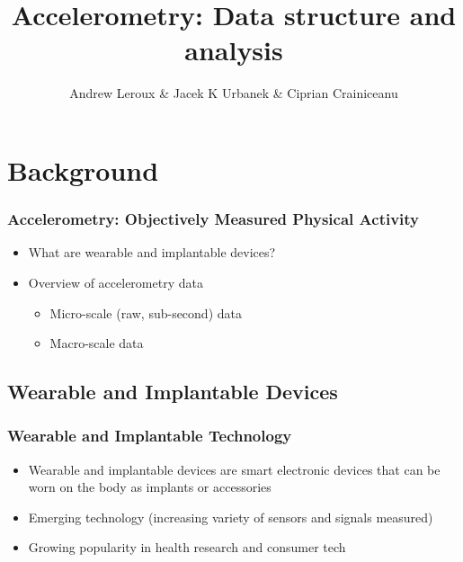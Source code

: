 \documentclass[10pt]{beamer}\usepackage[]{graphicx}\usepackage[]{color}
\newcommand\makebeamertitle{\frame{\maketitle}}%
\begin{document}
\title[]{Accelerometry: Data structure and analysis}
\author[]{Andrew Leroux \& Jacek K Urbanek \& Ciprian Crainiceanu}
\makebeamertitle




\section{Background}

\begin{frame}
\frametitle{Accelerometry: Objectively Measured Physical Activity}
\begin{itemize}
\item What are wearable and implantable devices?
\item Overview of accelerometry data 
    \begin{itemize}
    \item Micro-scale (raw, sub-second) data
    \item Macro-scale data
    \end{itemize}
\end{itemize}
\end{frame}


\subsection{Wearable and Implantable Devices}


\begin{frame}
\frametitle{Wearable and Implantable Technology}
\begin{itemize}
\item Wearable and implantable devices are smart electronic devices that can be worn on the body as implants or accessories
\item Emerging technology (increasing variety of sensors and signals measured)
\item Growing popularity in health research and consumer tech
\end{itemize}
\end{frame}
\end{document}

